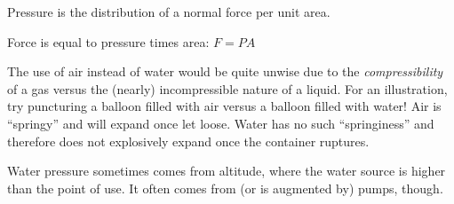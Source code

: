 
Pressure is the distribution of a normal force per unit area.

\vskip 10pt

Force is equal to pressure times area: $F = PA$

\vskip 10pt

The use of air instead of water would be quite unwise due to the {\it compressibility} of a gas versus the (nearly) incompressible nature of a liquid.  For an illustration, try puncturing a balloon filled with air versus a balloon filled with water!  Air is ``springy'' and will expand once let loose.  Water has no such ``springiness'' and therefore does not explosively expand once the container ruptures.

\vskip 10pt

Water pressure sometimes comes from altitude, where the water source is higher than the point of use.  It often comes from (or is augmented by) pumps, though.




